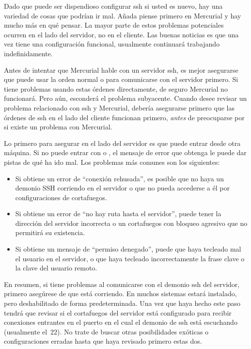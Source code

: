 Dado que puede ser dispendioso configurar ssh si usted es nuevo, hay 
una variedad de cosas que podrían ir mal.  Añada piense primero en
Mercurial y hay mucho más en qué pensar.  La mayor parte de estos
problemas potenciales ocurren en el lado del servidor, no en el cliente.
Las buenas noticias es que una vez tiene una configuración funcional,
usualmente continuará trabajando indefinidamente.

Antes de intentar que Mercurial hable con un servidor ssh, es mejor
asegurarse que puede usar la orden normal  o 
para comunicarse con el servidor primero.  Si tiene problemas usando
estas órdenes directamente, de seguro Mercurial no funcionará.  Pero aún,
esconderá el problema subyacente.  Cuando desee revisar un problema
relacionado con ssh y Mercurial, debería asegurarse primero que las
órdenes de ssh en el lado del cliente funcionan primero, \emph{antes}
de preocuparse por si existe un problema con Mercurial.

Lo primero para asegurar en el lado del servidor es que puede entrar
desde otra máquina.  Si no puede entrar con  o 
, el mensaje de error que obtenga le puede dar pistas
de qué ha ido mal.  Los problemas más comunes son los siguientes:
\begin{itemize}
\item Si obtiene un error de ``conexión rehusada'', es posible que no 
  haya un demonio SSH corriendo en el servidor o que no pueda accederse
  a él por configuraciones de cortafuegos.
\item Si obtiene un error de ``no hay ruta hasta el servidor'', puede
  tener la dirección del servidor incorrecta o un cortafuegos con
  bloqueo agresivo que no permitirá su existencia.
\item Si obtiene un mensaje de ``permiso denegado'', puede que haya
  tecleado mal el usuario en el servidor, o que haya tecleado
  incorrectamente la frase clave o la clave del usuario remoto.
\end{itemize}
En resumen, si tiene problemas al comunicarse con el demonio ssh del
servidor, primero asegúrese de que está corriendo.  En muchos sistemas
estará instalado, pero deshabilitado de forma predeterminada.  Una vez
que haya hecho este paso tendrá que revisar si el cortafuegos del
servidor está configurado para recibir conexiones entrantes en el
puerto en el cual el demonio de ssh está escuchando (usualmente el~22).
No trate de buscar otras posibilidades exóticas o configuraciones
erradas hasta que haya revisado primero estas dos.


